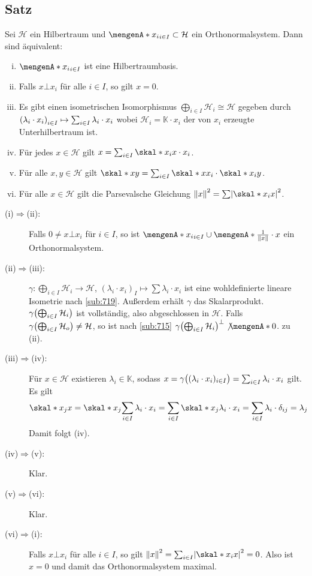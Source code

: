 \subsection{Satz} %
\label{sub:722}
Sei $\mathcal{H}$ ein Hilbertraum und $\set{x_i}_{i \in I} \subset \mathcal{H}$ ein Orthonormalsystem. Dann sind äquivalent: 
\begin{enumerate}[(i)]
	\item $\set{x_i}_{i \in I}$ ist eine Hilbertraumbasis. 
	\item Falls $x \bot x_i$ für alle $i \in I$, so gilt $x=0$.
	\item Es gibt einen isometrischen Isomorphismus $\bigoplus_{i \in I} \mathcal{H}_i \cong \mathcal{H}$ gegeben durch 
	\(
		\enbrace*{\lambda_i \cdot x_i}_{i \in I} \mapsto \sum_{i \in I} \lambda_i \cdot x_i 
	\)
	wobei $\mathcal{H}_i = \mathds{K} \cdot x_i$ der von $x_i$ erzeugte Unterhilbertraum ist.
	\item Für jedes $x \in \mathcal{H}$ gilt $x= \sum_{i \in I} \skal*{x_i}{x} \cdot x_i$.
	\item Für alle $x,y \in \mathcal{H}$ gilt $\skal*{x}{y} = \sum_{i \in I} \skal*{x}{x_i} \cdot \skal*{x_i}{y}$.
	\item Für alle $x \in \mathcal{H}$ gilt die Parsevalsche Gleichung $\norm{x}^2 = \sum \abs*{\skal*{x_i}{x}}^2$.
\end{enumerate}
\begin{description}
	\item[(i)$\Rightarrow$(ii):] Falls $0 \not= x \bot x_i$ für $i \in I$, so ist $\set{x_i}_{i \in I} \cup \set{\frac{1}{\norm{x}} \cdot x}$ ein Orthonormalsystem. \light
	\item[(ii)$\Rightarrow$(iii):] $\gamma \colon \bigoplus_{i \in I} \mathcal{H}_i \to \mathcal{H}$, $(\lambda_i \cdot x_i)_I \mapsto \sum \lambda_i \cdot x_i$ ist eine
	wohldefinierte lineare Isometrie nach \ref{sub:719}. Außerdem erhält $\gamma$ das Skalarprodukt. $\gamma \enbrace*{\bigoplus_{i \in I} \mathcal{H}_i}$ ist vollständig,
	also abgeschlossen in $\mathcal{H}$. Falls $\gamma \enbrace*{\bigoplus_{i\in I} \mathcal{H}_o} \not= \mathcal{H}$, so ist nach \ref{sub:715} 
	$\gamma \enbrace*{\bigoplus_{i \in I} \mathcal{H}_i}^\bot \not \set{0}$. \light zu (ii). 
	\item[(iii)$\Rightarrow$(iv):] Für $x \in \mathcal{H}$ existieren $\lambda_i \in \mathds{K}$,  sodass 
	$x= \gamma \enbrace[\big]{(\lambda_i \cdot x_i)_{i \in I}} = \sum_{i \in I} \lambda_i \cdot x_i$ gilt. Es gilt 
	\begin{align*}
		\skal*{x_j}{x} = \skal*{x_j}{\sum_{i \in I} \lambda_i \cdot x_i} = \sum_{i \in I} \skal*{x_j}{\lambda_i \cdot x_i} = \sum_{i\in I} \lambda_i \cdot \delta_{ij} = \lambda_j
	\end{align*}
	Damit folgt (iv).
	\item[(iv)$\Rightarrow$(v):] Klar.
	\item[(v)$\Rightarrow$(vi):] Klar.
	\item[(vi)$\Rightarrow$(i):] Falls $x \bot x_i$ für alle $i \in I$, so gilt $\norm{x}^2= \sum_{i \in I} \abs*{\skal*{x_i}{x}}^2 =0$. Also ist $x=0$ und damit das 
	Orthonormalsystem maximal. \bewende
\end{description}

